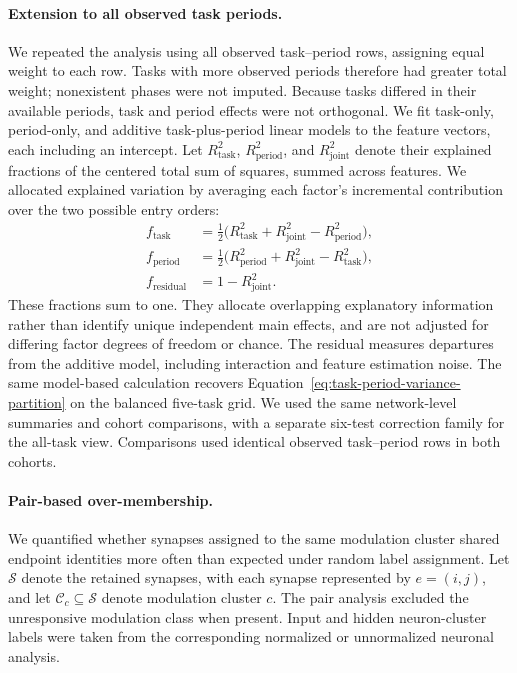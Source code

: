 \documentclass{article}
\begin{document}
\paragraph{Extension to all observed task periods.}
We repeated the analysis using all observed task--period rows, assigning
equal weight to each row. Tasks with more observed periods therefore had
greater total weight; nonexistent phases were not imputed. Because tasks
differed in their available periods, task and period effects were not
orthogonal. We fit task-only, period-only, and additive task-plus-period
linear models to the feature vectors, each including an intercept. Let
$R^2_{\mathrm{task}}$, $R^2_{\mathrm{period}}$, and
$R^2_{\mathrm{joint}}$ denote their explained fractions of the centered
total sum of squares, summed across features. We allocated explained
variation by averaging each factor's incremental contribution over the
two possible entry orders:
\begin{align}
    f_{\mathrm{task}} &= \tfrac12\bigl(R^2_{\mathrm{task}}
                           +R^2_{\mathrm{joint}}-R^2_{\mathrm{period}}\bigr), \\
    f_{\mathrm{period}} &= \tfrac12\bigl(R^2_{\mathrm{period}}
                           +R^2_{\mathrm{joint}}-R^2_{\mathrm{task}}\bigr), \\
    f_{\mathrm{residual}} &= 1-R^2_{\mathrm{joint}}.
    \label{eq:all-task-variance-allocation}
\end{align}
These fractions sum to one. They allocate overlapping explanatory
information rather than identify unique independent main effects, and
are not adjusted for differing factor degrees of freedom or chance.
The residual measures departures from the additive model, including
interaction and feature estimation noise. The same model-based calculation
recovers Equation~\ref{eq:task-period-variance-partition} on the balanced
five-task grid. We used the same network-level summaries and cohort
comparisons, with a separate six-test correction family for the all-task
view. Comparisons used identical observed task--period rows in both cohorts.

\paragraph{Pair-based over-membership.}
We quantified whether synapses assigned to the same modulation cluster
shared endpoint identities more often than expected under random label
assignment. Let $\mathcal{S}$ denote the retained synapses, with each
synapse represented by $e=(i,j)$, and let $\mathcal{C}_c\subseteq\mathcal{S}$
denote modulation cluster $c$. The pair analysis excluded the unresponsive
modulation class when present. Input and hidden neuron-cluster labels were
taken from the corresponding normalized or unnormalized neuronal analysis.
\end{document}
